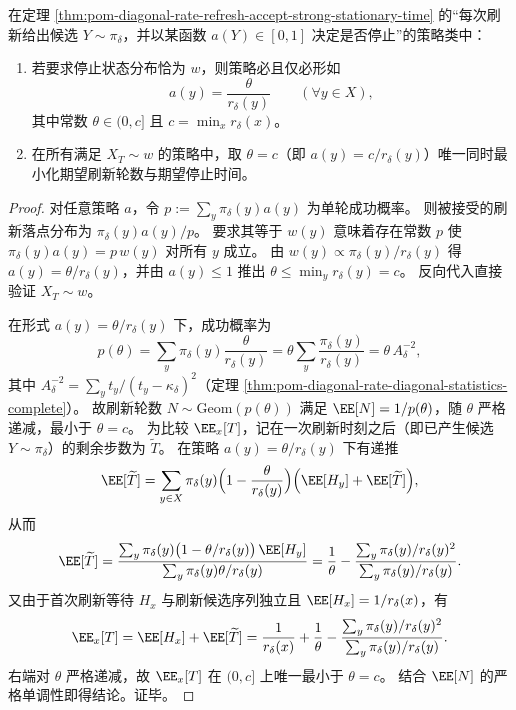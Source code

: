 \begin{proposition}\label{prop:pom-diagonal-rate-refresh-accept-uniqueness-optimality}
在定理 \ref{thm:pom-diagonal-rate-refresh-accept-strong-stationary-time} 的“每次刷新给出候选 \(Y\sim\pi_\delta\)，并以某函数 \(a(Y)\in[0,1]\) 决定是否停止”的策略类中：
\begin{enumerate}
  \item 若要求停止状态分布恰为 \(w\)，则策略必且仅必形如
  \[
  a(y)=\frac{\theta}{r_\delta(y)}\qquad(\forall y\in X),
  \]
  其中常数 \(\theta\in(0,c]\) 且 \(c=\min_x r_\delta(x)\)。
  \item 在所有满足 \(X_T\sim w\) 的策略中，取 \(\theta=c\)（即 \(a(y)=c/r_\delta(y)\)）唯一同时最小化期望刷新轮数与期望停止时间。
\end{enumerate}
\end{proposition}
\begin{proof}
对任意策略 \(a\)，令 \(p:=\sum_y \pi_\delta(y)a(y)\) 为单轮成功概率。
则被接受的刷新落点分布为 \(\pi_\delta(y)a(y)/p\)。
要求其等于 \(w(y)\) 意味着存在常数 \(p\) 使 \(\pi_\delta(y)a(y)=p\,w(y)\) 对所有 \(y\) 成立。
由 \(w(y)\propto \pi_\delta(y)/r_\delta(y)\) 得 \(a(y)=\theta/r_\delta(y)\)，并由 \(a(y)\le 1\) 推出 \(\theta\le \min_y r_\delta(y)=c\)。
反向代入直接验证 \(X_T\sim w\)。
\par
在形式 \(a(y)=\theta/r_\delta(y)\) 下，成功概率为
\[
p(\theta)=\sum_y \pi_\delta(y)\frac{\theta}{r_\delta(y)}=\theta\sum_y\frac{\pi_\delta(y)}{r_\delta(y)}=\theta\,A_\delta^{-2},
\]
其中 \(A_\delta^{-2}=\sum_y t_y/(t_y-\kappa_\delta)^2\)（定理 \ref{thm:pom-diagonal-rate-diagonal-statistics-complete}）。
故刷新轮数 \(N\sim\mathrm{Geom}(p(\theta))\) 满足 \(\EE[N]=1/p(\theta)\)，随 \(\theta\) 严格递减，最小于 \(\theta=c\)。
为比较 \(\EE_x[T]\)，记在一次刷新时刻之后（即已产生候选 \(Y\sim\pi_\delta\)）的剩余步数为 \(\widetilde T\)。
在策略 \(a(y)=\theta/r_\delta(y)\) 下有递推
\[
\EE[\widetilde T]
=\sum_{y\in X}\pi_\delta(y)\Bigl(1-\frac{\theta}{r_\delta(y)}\Bigr)\Bigl(\EE[H_y]+\EE[\widetilde T]\Bigr),
\]
从而
\[
\EE[\widetilde T]
=\frac{\sum_y \pi_\delta(y)\bigl(1-\theta/r_\delta(y)\bigr)\,\EE[H_y]}{\sum_y \pi_\delta(y)\theta/r_\delta(y)}
=\frac{1}{\theta}-\frac{\sum_y \pi_\delta(y)/r_\delta(y)^2}{\sum_y \pi_\delta(y)/r_\delta(y)}.
\]
又由于首次刷新等待 \(H_x\) 与刷新候选序列独立且 \(\EE[H_x]=1/r_\delta(x)\)，有
\[
\EE_x[T]=\EE[H_x]+\EE[\widetilde T]
=\frac{1}{r_\delta(x)}+\frac{1}{\theta}-\frac{\sum_y \pi_\delta(y)/r_\delta(y)^2}{\sum_y \pi_\delta(y)/r_\delta(y)}.
\]
右端对 \(\theta\) 严格递减，故 \(\EE_x[T]\) 在 \((0,c]\) 上唯一最小于 \(\theta=c\)。
结合 \(\EE[N]\) 的严格单调性即得结论。证毕。
\end{proof}

